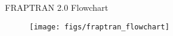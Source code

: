 \begin{frame}{FRAPTRAN 2.0 Flowchart}

  \scriptsize

  \begin{figure}[h]
    \texttt{[image: figs/fraptran\_flowchart]}
  \end{figure}  

\end{frame}